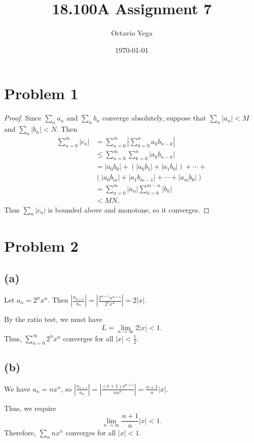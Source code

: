 \documentclass{article}
\title{18.100A Assignment 7}
\author{Octavio Vega}
\date\today
\begin{document}
\maketitle
	
\section*{Problem 1}
\begin{proof}
	Since $\sum_n a_n$ and $\sum_n b_n$ converge absolutely, suppose that $\sum_n |a_n| < M$ and $\sum_n |b_n| < N$. Then
	\begin{align}
		\sum_{n=0}^{m}|c_n| &= \sum_{n=0}^m \left|\sum_{k=0}^n a_k b_{n-k}\right| \\
		& \leq \sum_{n=0}^m \sum_{k=0}^n |a_k b_{n-k}| \\
		&= |a_0 b_0| + (|a_0 b_1| + |a_1 b_0|) + \cdots + \nonumber \\&(|a_0 b_m | + |a_1 b_{m-1}| + \cdots + |a_m b_0|) \\
		&= \sum_{n=0}^m |a_n| \sum_{k=0}^{m-n}|b_k| \\
		&< MN.
	\end{align}
	Thus $\sum_n |c_n|$ is bounded above and monotone, so it converges.
\end{proof}
\section*{Problem 2}
\subsection*{(a)}
Let $a_n = 2^n x^n$. Then $\left|\frac{a_{n+1}}{a_n}\right| = \left|\frac{2^{n+1}x^{n+1}}{2^n x^n}\right| = 2 |x|$.

By the ratio test, we must have
\begin{equation}
	L = \lim_{n \to \infty} 2 |x| < 1.
\end{equation}
Thus, $\sum_{n=0}^{\infty} 2^n x^n$ converges for all $|x| < \frac{1}{2}$.

\subsection*{(b)}
We have $a_n = n x^n$, so $\left|\frac{a_{n+1}}{a_n}\right| = \left|\frac{(n+1)x^{n+1}}{nx^n}\right| = \frac{n+1}{n}|x|$.

Thus, we require
\begin{equation}
	\lim_{n \to \infty} \frac{n+1}{n}|x| < 1.
\end{equation}
Therefore, $\sum_n n x^n$ converges for all $|x| < 1$. 
\end{document}
